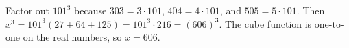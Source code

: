 Factor out $101^3$ because $303=3\cdot101$, $404=4\cdot101$, and $505=5\cdot101$. Then $x^3=101^3(27+64+125)=101^3\cdot216=(606)^3$. The cube function is one-to-one on the real numbers, so $\boxed{x=606}$.
